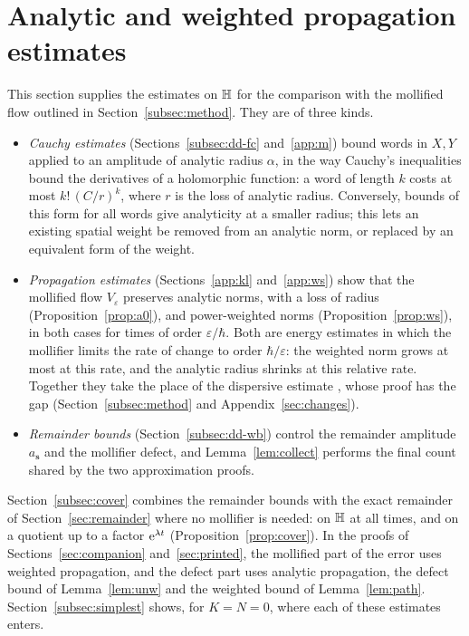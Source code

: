 \section{Analytic and weighted propagation estimates}\label{sec:analytic}
This section supplies the estimates on $\mathbb{H}$ for the comparison with the mollified flow outlined in Section~\ref{subsec:method}.
They are of three kinds.
\begin{itemize}
\item \emph{Cauchy estimates} (Sections~\ref{subsec:dd-fc} and~\ref{app:m}) bound words in $X,Y$ applied to an amplitude of analytic
radius $\alpha$, in the way Cauchy's inequalities bound the derivatives of a holomorphic function: a word of length $k$ costs at
most $k!\,(C/r)^k$, where $r$ is the loss of analytic radius. Conversely, bounds of this form for all words give analyticity at a
smaller radius; this lets an existing spatial weight be removed from an analytic norm, or replaced by an equivalent form of
the weight.
\item \emph{Propagation estimates} (Sections~\ref{app:kl} and~\ref{app:ws}) show that the mollified flow $V_\varepsilon$ preserves
analytic norms, with a loss of radius (Proposition~\ref{prop:a0}), and power-weighted norms (Proposition~\ref{prop:ws}), in both cases
for times of order $\varepsilon/\hbar$. Both are energy estimates in which the mollifier limits the rate of change to order
$\hbar/\varepsilon$: the weighted norm grows at most at this rate, and the analytic radius shrinks at this relative rate.
Together they take the place of the dispersive estimate \cite[Theorem~4.4]{S}, whose proof has the gap
(Section~\ref{subsec:method} and Appendix~\ref{sec:changes}).
\item \emph{Remainder bounds} (Section~\ref{subsec:dd-wb}) control the remainder amplitude $a_{\mathbf s}$ and the mollifier defect,
and Lemma~\ref{lem:collect} performs the final count shared by the two approximation proofs.
\end{itemize}
Section~\ref{subsec:cover} combines the remainder bounds with the exact remainder of Section~\ref{sec:remainder} where no mollifier
is needed: on $\mathbb{H}$ at all times, and on a quotient up to a factor $\mathrm{e}^{\lambda t}$ (Proposition~\ref{prop:cover}).
In the proofs of Sections~\ref{sec:companion} and~\ref{sec:printed}, the mollified part of the error uses weighted propagation, and
the defect part uses analytic propagation, the defect bound of Lemma~\ref{lem:unw} and the weighted bound of Lemma~\ref{lem:path}.
Section~\ref{subsec:simplest} shows, for $K=N=0$, where each of these estimates enters.

